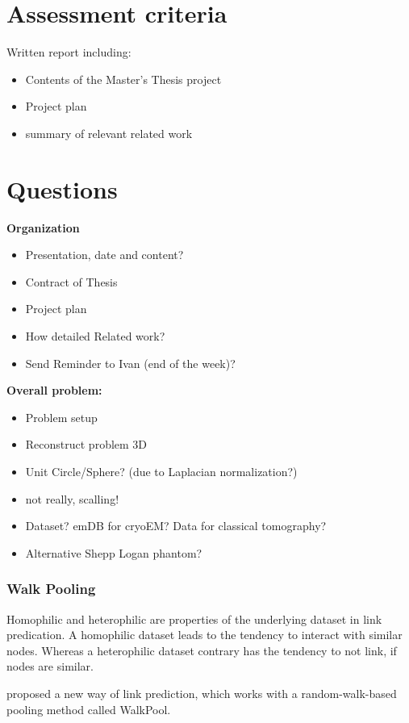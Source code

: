 \chapter{Assessment criteria}
Written report including: 
\begin{itemize}
    \item Contents of the Master's Thesis project
    \item Project plan
    \item summary of relevant related work
\end{itemize}

\chapter{Questions}


\textbf{Organization}
\begin{itemize}
    \item Presentation, date and content?
    \item Contract of Thesis
    \item Project plan
    \item How detailed Related work?
    \item Send Reminder to Ivan (end of the week)?
\end{itemize}

\textbf{Overall problem:}
\begin{itemize}
    \item Problem setup
    \item Reconstruct problem 3D
    \item Unit Circle/Sphere? (due to Laplacian normalization?)
    \item not really, scalling! 
    \item Dataset? emDB for cryoEM? Data for classical tomography?
    \item Alternative Shepp Logan phantom?
\end{itemize}

\subsection{Walk Pooling}

Homophilic and heterophilic are properties of the underlying dataset in link predication. 
A homophilic dataset leads to the tendency to interact with similar nodes. Whereas a heterophilic dataset contrary has the tendency to 
not link, if nodes are similar.

\citet{walkPooling} proposed a new way of link prediction, which works
with a random-walk-based pooling method called WalkPool.

